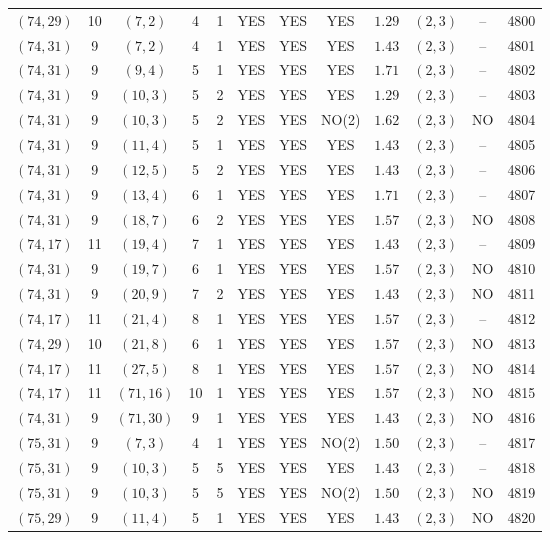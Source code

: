 \begin{longtable}{|c|c|c|c|c|c|c|c|c|c|c|c|}
$(74,29)$ & 10 & $(7,2)$ & 4 & 1 & YES & YES & YES & $1.29$ & $(2,3)$ & -- & 4800\\
$(74,31)$ & 9 & $(7,2)$ & 4 & 1 & YES & YES & YES & $1.43$ & $(2,3)$ & -- & 4801\\
$(74,31)$ & 9 & $(9,4)$ & 5 & 1 & YES & YES & YES & $1.71$ & $(2,3)$ & -- & 4802\\
$(74,31)$ & 9 & $(10,3)$ & 5 & 2 & YES & YES & YES & $1.29$ & $(2,3)$ & -- & 4803\\
$(74,31)$ & 9 & $(10,3)$ & 5 & 2 & YES & YES & NO(2) & $1.62$ & $(2,3)$ & NO & 4804\\
$(74,31)$ & 9 & $(11,4)$ & 5 & 1 & YES & YES & YES & $1.43$ & $(2,3)$ & -- & 4805\\
$(74,31)$ & 9 & $(12,5)$ & 5 & 2 & YES & YES & YES & $1.43$ & $(2,3)$ & -- & 4806\\
$(74,31)$ & 9 & $(13,4)$ & 6 & 1 & YES & YES & YES & $1.71$ & $(2,3)$ & -- & 4807\\
$(74,31)$ & 9 & $(18,7)$ & 6 & 2 & YES & YES & YES & $1.57$ & $(2,3)$ & NO & 4808\\
$(74,17)$ & 11 & $(19,4)$ & 7 & 1 & YES & YES & YES & $1.43$ & $(2,3)$ & -- & 4809\\
$(74,31)$ & 9 & $(19,7)$ & 6 & 1 & YES & YES & YES & $1.57$ & $(2,3)$ & NO & 4810\\
$(74,31)$ & 9 & $(20,9)$ & 7 & 2 & YES & YES & YES & $1.43$ & $(2,3)$ & NO & 4811\\
$(74,17)$ & 11 & $(21,4)$ & 8 & 1 & YES & YES & YES & $1.57$ & $(2,3)$ & -- & 4812\\
$(74,29)$ & 10 & $(21,8)$ & 6 & 1 & YES & YES & YES & $1.57$ & $(2,3)$ & NO & 4813\\
$(74,17)$ & 11 & $(27,5)$ & 8 & 1 & YES & YES & YES & $1.57$ & $(2,3)$ & NO & 4814\\
$(74,17)$ & 11 & $(71,16)$ & 10 & 1 & YES & YES & YES & $1.57$ & $(2,3)$ & NO & 4815\\
$(74,31)$ & 9 & $(71,30)$ & 9 & 1 & YES & YES & YES & $1.43$ & $(2,3)$ & NO & 4816\\
$(75,31)$ & 9 & $(7,3)$ & 4 & 1 & YES & YES & NO(2) & $1.50$ & $(2,3)$ & -- & 4817\\
$(75,31)$ & 9 & $(10,3)$ & 5 & 5 & YES & YES & YES & $1.43$ & $(2,3)$ & -- & 4818\\
$(75,31)$ & 9 & $(10,3)$ & 5 & 5 & YES & YES & NO(2) & $1.50$ & $(2,3)$ & NO & 4819\\
$(75,29)$ & 9 & $(11,4)$ & 5 & 1 & YES & YES & YES & $1.43$ & $(2,3)$ & NO & 4820\\

\end{longtable}
